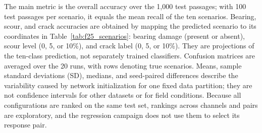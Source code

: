 The main metric is the overall accuracy over the 1,000 test passages; with 100
test passages per scenario, it equals the mean recall of the ten scenarios.
Bearing, scour, and crack accuracies are obtained by mapping the predicted
scenario to its coordinates in Table~\ref{tab:f25_scenarios}: bearing damage
(present or absent), scour level (0, 5, or 10\%), and crack label (0, 5, or
10\%). They are projections of the ten-class prediction, not separately
trained classifiers. Confusion matrices are averaged over the 20 runs, with
rows denoting true scenarios. Means, sample standard deviations (SD), medians,
and seed-paired differences describe the variability caused by network
initialization for one fixed data partition; they are not confidence intervals
for other datasets or for field conditions. Because all configurations are
ranked on the same test set, rankings across channels and pairs are
exploratory, and the regression campaign does not use them to select its
response pair.
